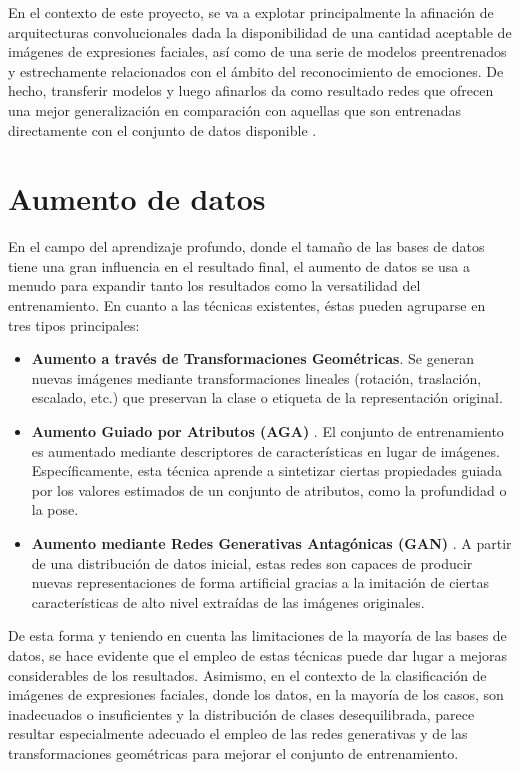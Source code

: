 En el contexto de este proyecto, se va a explotar principalmente la afinación de arquitecturas convolucionales dada la disponibilidad de una cantidad aceptable de imágenes de expresiones faciales, así como de una serie de modelos preentrenados y estrechamente relacionados con el ámbito del reconocimiento de emociones. De hecho, transferir modelos y luego afinarlos da como resultado redes que ofrecen una mejor generalización en comparación con aquellas que son entrenadas directamente con el conjunto de datos disponible \cite{TransferLearning}.

\section{Aumento de datos} \label{Chapter:DataAugmentation}

En el campo del aprendizaje profundo, donde el tamaño de las bases de datos tiene una gran influencia en el resultado final, el aumento de datos se usa a menudo para expandir tanto los resultados como la versatilidad del entrenamiento. En cuanto a las técnicas existentes, éstas pueden agruparse en tres tipos principales:

\begin{itemize}
    \item \textbf{Aumento a través de Transformaciones Geométricas}. Se generan nuevas imágenes mediante transformaciones lineales (rotación, traslación, escalado, etc.) que preservan la clase o etiqueta de la representación original.
    \item \textbf{Aumento Guiado por Atributos (AGA)} \cite{AGA}. El conjunto de entrenamiento es aumentado mediante descriptores de características en lugar de imágenes. Específicamente, esta técnica aprende a sintetizar ciertas propiedades guiada por los valores estimados de un conjunto de atributos, como la profundidad o la pose.
    \item \textbf{Aumento mediante Redes Generativas Antagónicas (GAN)} \cite{GAN}. A partir de una distribución de datos inicial, estas redes son capaces de producir nuevas representaciones de forma artificial gracias a la imitación de ciertas características de alto nivel extraídas de las imágenes originales.
\end{itemize}

De esta forma y teniendo en cuenta las limitaciones de la mayoría de las bases de datos, se hace evidente que el empleo de estas técnicas puede dar lugar a mejoras considerables de los resultados. Asimismo, en el contexto de la clasificación de imágenes de expresiones faciales, donde los datos, en la mayoría de los casos, son inadecuados o insuficientes y la distribución de clases desequilibrada, parece resultar especialmente adecuado el empleo de las redes generativas y de las transformaciones geométricas para mejorar el conjunto de entrenamiento.

